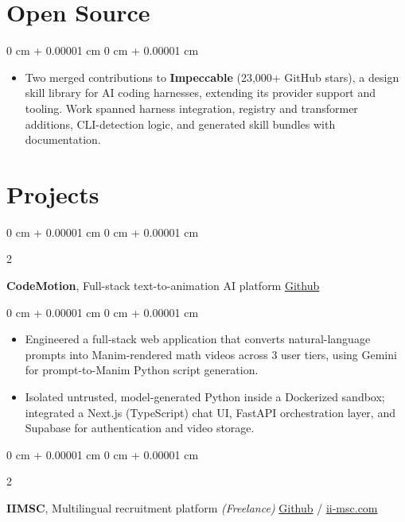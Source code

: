 \documentclass[10pt, letterpaper]{article}
\newenvironment{highlights}{
    \begin{itemize}[
        topsep=0.10 cm,
        parsep=0.10 cm,
        partopsep=0pt,
        itemsep=0pt,
        leftmargin=0 cm + 10pt
    ]
}{
    \end{itemize}
} %
\newenvironment{onecolentry}{
    \begin{adjustwidth}{
        0 cm + 0.00001 cm
    }{
        0 cm + 0.00001 cm
    }
}{
    \end{adjustwidth}
} %
\newenvironment{twocolentry}[2][]{
    \onecolentry
    \def\secondColumn{#2}
    \setcolumnwidth{\fill, 4.5 cm}
    \begin{paracol}{2}
}{
    \switchcolumn \raggedleft \secondColumn
    \end{paracol}
    \endonecolentry
} %
\begin{document}
    \section{Open Source}

        \begin{onecolentry}
            \begin{highlights}
                \item Two merged contributions to \textbf{Impeccable} (23,000+ GitHub stars), a design skill library for AI coding harnesses, extending its provider support and tooling. Work spanned harness integration, registry and transformer additions, CLI-detection logic, and generated skill bundles with documentation.
            \end{highlights}
        \end{onecolentry}


    \section{Projects}

        \begin{twocolentry}{
            \href{https://github.com/vinaypokharkar/CodeMotion}{Github}
        }
            \textbf{CodeMotion}, Full-stack text-to-animation AI platform \end{twocolentry}

        \vspace{0.10 cm}
        \begin{onecolentry}
            \begin{highlights}
                \item Engineered a full-stack web application that converts natural-language prompts into Manim-rendered math videos across 3 user tiers, using Gemini for prompt-to-Manim Python script generation.
                \item Isolated untrusted, model-generated Python inside a Dockerized sandbox; integrated a Next.js (TypeScript) chat UI, FastAPI orchestration layer, and Supabase for authentication and video storage.
            \end{highlights}
        \end{onecolentry}

        \vspace{0.2 cm}

        \begin{twocolentry}{
            \href{https://github.com/vinaypokharkar/iimsc}{Github} / \href{https://ii-msc.com}{ii-msc.com}
        }
            \textbf{IIMSC}, Multilingual recruitment platform \textit{(Freelance)} \end{twocolentry}
\end{document}

